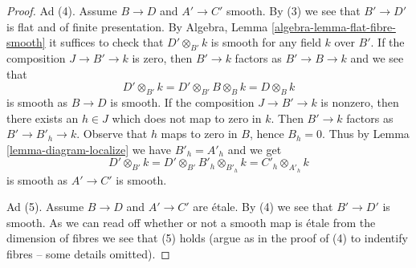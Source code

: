 \begin{proof}
\medskip\noindent
Ad (4). Assume $B \to D$ and $A' \to C'$ smooth.
By (3) we see that $B' \to D'$ is flat and of finite presentation.
By Algebra, Lemma \ref{algebra-lemma-flat-fibre-smooth}
it suffices to check that $D' \otimes_{B'} k$ is smooth for any
field $k$ over $B'$. If the composition $J \to B' \to k$ is zero,
then $B' \to k$ factors as $B' \to B \to k$ and we see that
$$
D' \otimes_{B'} k = D' \otimes_{B'} B \otimes_B k
= D \otimes_B k
$$
is smooth as $B \to D$ is smooth. If the composition $J \to B' \to k$
is nonzero, then there exists an $h \in J$ which does not map to zero
in $k$. Then $B' \to k$ factors as $B' \to B'_h \to k$.
Observe that $h$ maps to zero in $B$, hence $B_h = 0$.
Thus by Lemma \ref{lemma-diagram-localize} we have $B'_h = A'_h$ and we get
$$
D' \otimes_{B'} k = D' \otimes_{B'} B'_h \otimes_{B'_h} k
= C'_h \otimes_{A'_h} k
$$
is smooth as $A' \to C'$ is smooth.

\medskip\noindent
Ad (5). Assume $B \to D$ and $A' \to C'$ are \'etale. By (4) we see that
$B' \to D'$ is smooth. As we can read off whether or not a smooth
map is \'etale from the dimension of fibres we see that (5) holds
(argue as in the proof of (4) to indentify fibres -- some details omitted).
\end{proof}

